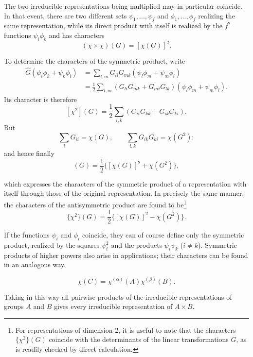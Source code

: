 The two irreducible representations being multiplied may in particular coincide. In that event, there are two different sets $\psi_1,\ldots,\psi_f$ and $\phi_1,\ldots,\phi_f$ realizing the same representation, while its direct product with itself is realized by the $f^2$ functions $\psi_i\phi_k$ and has characters
\[
 (\chi\mathbin{\times}\chi)(G)=[\chi(G)]^2.
\]


To determine the characters of the symmetric product, write
\[
 \begin{aligned}
 \widehat G(\psi_i\phi_k+\psi_k\phi_i)
 &=\sum_{l,m}G_{li}G_{mk}(\psi_l\phi_m+\psi_m\phi_l)\\
 &=\frac12\sum_{l,m}(G_{li}G_{mk}+G_{mi}G_{lk})(\psi_l\phi_m+\psi_m\phi_l).
 \end{aligned}
\]
Its character is therefore
\[
 [\chi^2](G)=\frac12\sum_{i,k}(G_{ii}G_{kk}+G_{ik}G_{ki}).
\]
But
\[
 \sum_iG_{ii}=\chi(G),\qquad \sum_{i,k}G_{ik}G_{ki}=\chi(G^2);
\]
and hence finally
\begin{equation}
 [\chi^2](G)=\frac12\{[\chi(G)]^2+\chi(G^2)\},
 \tag{94.22}
\end{equation}

which expresses the characters of the symmetric product of a representation with itself through those of the original representation. In precisely the same manner, the characters of the antisymmetric product are found to be\footnote{For representations of dimension 2, it is useful to note that the characters $\{\chi^2\}(G)$ coincide with the determinants of the linear transformations $G$, as is readily checked by direct calculation.}
\begin{equation}
 \{\chi^2\}(G)=\frac12\{[\chi(G)]^2-\chi(G^2)\}.
 \tag{94.23}
\end{equation}

If the functions $\psi_i$ and $\phi_i$ coincide, they can of course define only the symmetric product, realized by the squares $\psi_i^2$ and the products $\psi_i\psi_k$ ($i\ne k$). Symmetric products of higher powers also arise in applications; their characters can be found in an analogous way.




\begin{equation}
 \chi(C)=\chi^{(\alpha)}(A)\chi^{(\beta)}(B).
 \tag{94.24}
\end{equation}

Taking in this way all pairwise products of the irreducible representations of groups $A$ and $B$ gives every irreducible representation of $A\times B$.

